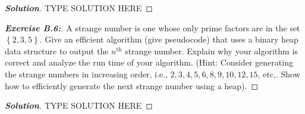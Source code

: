 \documentclass[a4paper]{article}
\newenvironment{solution}{\begin{proof}[\textnormal{\textbf{Solution}}]}{\end{proof}}
\newenvironment{exercise}[1]{\begin{proof}[\textnormal{\textbf{Exercise #1:}}]\renewcommand{\qedsymbol}{}}{\end{proof}}
\newcommand{\set}[1]{\left\lbrace#1\right\rbrace}
\newcommand{\ith}[1]{#1^{\text{th}}}
\begin{document}
\begin{solution}
    TYPE SOLUTION HERE
\end{solution}

\begin{exercise}{B.6}
    A strange number is one whose only prime factors are in the set \(\set{2, 3, 5}\). Give an efficient algorithm (give pseudocode) that uses a binary heap data structure to output the \(\ith{n}\) strange number. Explain why your algorithm is correct and analyze the run time of your algorithm. (Hint: Consider generating the strange numbers in increasing order, i.e., \(2,3,4,5,6,8,9,10,12,15\), etc,. Show how to efficiently generate the next strange number using a heap).
\end{exercise}

\begin{solution}
    TYPE SOLUTION HERE
\end{solution}
\end{document}
